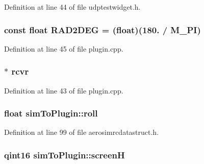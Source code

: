 \-Definition at line 44 of file udptestwidget.\-h.

\hypertarget{group___aero_sim_r_c_gabb429aecc5bba8de3564e19ded7ef104}{
\subsubsection[{\-R\-A\-D2\-D\-E\-G}]{\setlength{\rightskip}{0pt plus 5cm}const float {\bf \-R\-A\-D2\-D\-E\-G} = (float)(180. / \-M\-\_\-\-P\-I)}}\label{group___aero_sim_r_c_gabb429aecc5bba8de3564e19ded7ef104}


\-Definition at line 45 of file plugin.\-cpp.

\hypertarget{group___aero_sim_r_c_gaad1d57ea59d2f9fca3e53c6fb20ac134}{
\subsubsection[{rcvr}]{$\ast$ {\bf rcvr}}}\label{group___aero_sim_r_c_gaad1d57ea59d2f9fca3e53c6fb20ac134}


\-Definition at line 43 of file plugin.\-cpp.

\hypertarget{group___aero_sim_r_c_ga5ae77c3d47014ab64ef930314843a0fe}{
\subsubsection[{roll}]{\setlength{\rightskip}{0pt plus 5cm}float {\bf sim\-To\-Plugin\-::roll}}}\label{group___aero_sim_r_c_ga5ae77c3d47014ab64ef930314843a0fe}


\-Definition at line 99 of file aerosimrcdatastruct.\-h.

\hypertarget{group___aero_sim_r_c_gaf9235fc17924379e9bdd0826d1111e2c}{
\subsubsection[{screen\-H}]{\setlength{\rightskip}{0pt plus 5cm}qint16 {\bf sim\-To\-Plugin\-::screen\-H}}}\label{group___aero_sim_r_c_gaf9235fc17924379e9bdd0826d1111e2c}


